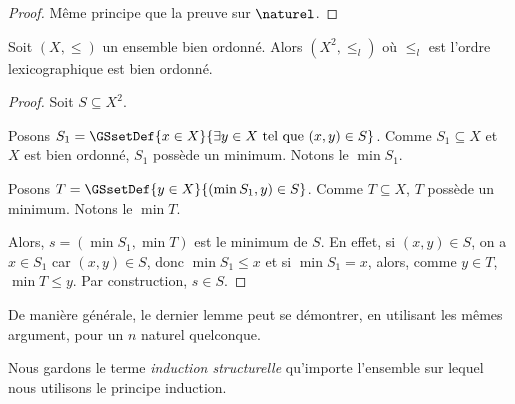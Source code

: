 \begin{proof}
  Même principe que la preuve sur $\naturel$.
\end{proof}

\begin{lemma}
  Soit $(X, \leq)$ un ensemble bien ordonné. Alors $(X^{2}, \leq_{l})$ où
  $\leq_{l}$ est l'ordre lexicographique est bien ordonné.
\end{lemma}

\begin{proof}
  Soit $S \subseteq X^{2}$.

  Posons $S_{1} = \GSsetDef{x \in X}{\exists y \in X \text{ tel que } (x, y) \in S}$.
  Comme $S_{1} \subseteq X$ et $X$ est bien ordonné, $S_{1}$ possède un minimum.
  Notons le $\min{S_{1}}$.

  Posons $T = \GSsetDef{y \in X}{(\min{S_{1}}, y) \in S}$. Comme $T \subseteq
  X$, $T$ possède un minimum. Notons le $\min{T}$.

  Alors, $s = (\min{S_{1}}, \min{T})$ est le minimum de $S$. En effet, si $(x, y)
  \in S$, on a $x \in S_{1}$ car $(x, y) \in S$, donc $\min{S_{1}} \leq x$ et si
  $\min{S_{1}} = x$, alors, comme $y \in T$, $\min{T} \leq y$. Par construction,
  $s \in S$.
\end{proof}

De manière générale, le dernier lemme peut se démontrer, en utilisant les mêmes
argument, pour un $n$ naturel quelconque.

Nous gardons le terme \textit{induction structurelle} qu'importe l'ensemble sur
lequel nous utilisons le principe induction.